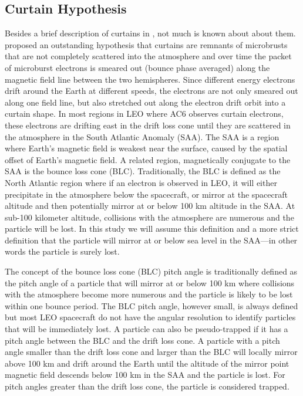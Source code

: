\documentclass[draft]{agujournal2019}
\begin{document}
\subsection{Curtain Hypothesis}
Besides a brief description of curtains in , not much is known about about them.  proposed an outstanding hypothesis that curtains are remnants of microbrusts that are not completely scattered into the atmosphere and over time the packet of microburst electrons is smeared out (bounce phase averaged) along the magnetic field line between the two hemispheres. Since different energy electrons drift around the Earth at different speeds, the electrons are not only smeared out along one field line, but also stretched out along the electron drift orbit into a curtain shape. In most regions in LEO where AC6 observes curtain electrons, these electrons are drifting east in the drift loss cone until they are scattered in the atmosphere in the South Atlantic Anomaly (SAA). The SAA is a region where Earth's magnetic field is weakest near the surface, caused by the spatial offset of Earth's magnetic field. A related region, magnetically conjugate to the SAA is the bounce loss cone (BLC). Traditionally, the BLC is defined as the North Atlantic region where if an electron is observed in LEO, it will either precipitate in the atmosphere below the spacecraft, or mirror at the spacecraft altitude and then potentially mirror at or below 100 km altitude in the SAA. At sub-100 kilometer altitude, collisions with the atmosphere are numerous and the particle will be lost. In this study we will assume this definition and a more strict definition that the particle will mirror at or below sea level in the SAA---in other words the particle is surely lost.

The concept of the bounce loss cone (BLC) pitch angle is traditionally defined as the pitch angle of a particle that will mirror at or below 100 km where collisions with the atmosphere become more numerous and the particle is likely to be lost within one bounce period. The BLC pitch angle, however small, is always defined but most LEO spacecraft do not have the angular resolution to identify particles that will be immediately lost. A particle can also be pseudo-trapped if it has a pitch angle between the BLC and the drift loss cone. A particle with a pitch angle smaller than the drift loss cone and larger than the BLC will locally mirror above 100 km and drift around the Earth until the altitude of the mirror point magnetic field descends below 100 km in the SAA and the particle is lost. For pitch angles greater than the drift loss cone, the particle is considered trapped.
\end{document}
